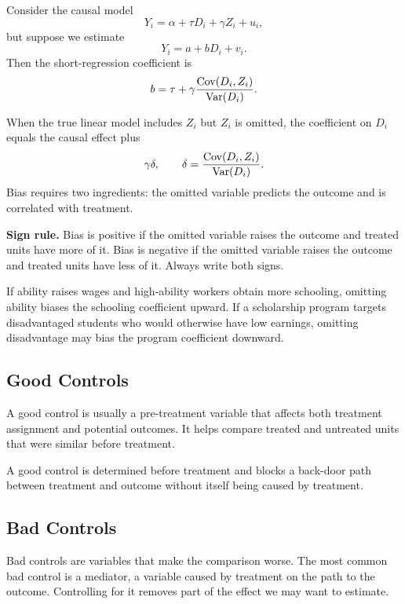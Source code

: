 Consider the causal model
\[
    Y_i=\alpha+\tau D_i+\gamma Z_i+u_i,
\]
but suppose we estimate
\[
    Y_i=a+bD_i+v_i.
\]
Then the short-regression coefficient is
\[
    b=\tau+\gamma\frac{\mathrm{Cov}(D_i,Z_i)}{\mathrm{Var}(D_i)}.
\]

\begin{thmN}
When the true linear model includes \(Z_i\) but \(Z_i\) is omitted, the
coefficient on \(D_i\) equals the causal effect plus
\[
    \gamma\delta,
    \qquad
    \delta=\frac{\mathrm{Cov}(D_i,Z_i)}{\mathrm{Var}(D_i)}.
\]
Bias requires two ingredients: the omitted variable predicts the outcome and is
correlated with treatment.
\end{thmN}

\begin{boxD}
\textbf{Sign rule.} Bias is positive if the omitted variable raises the outcome
and treated units have more of it. Bias is negative if the omitted variable
raises the outcome and treated units have less of it. Always write both signs.
\end{boxD}

\begin{exmp}
If ability raises wages and high-ability workers obtain more schooling, omitting
ability biases the schooling coefficient upward. If a scholarship program
targets disadvantaged students who would otherwise have low earnings, omitting
disadvantage may bias the program coefficient downward.
\end{exmp}

\subsection{Good Controls}

A good control is usually a pre-treatment variable that affects both treatment
assignment and potential outcomes. It helps compare treated and untreated units
that were similar before treatment.

\begin{defN}
A good control is determined before treatment and blocks a back-door path
between treatment and outcome without itself being caused by treatment.
\end{defN}

\subsection{Bad Controls}

Bad controls are variables that make the comparison worse. The most common bad
control is a mediator, a variable caused by treatment on the path to the
outcome. Controlling for it removes part of the effect we may want to estimate.

